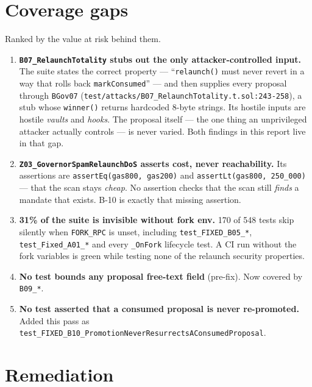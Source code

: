 \documentclass[11pt,a4paper]{article}
\newcommand{\code}[1]{\texttt{\small #1}}
\newcommand{\fileref}[1]{\texttt{\scriptsize #1}}
\begin{document}
\section{Coverage gaps}\label{sec:gaps}

Ranked by the value at risk behind them.

\begin{enumerate}
\item \textbf{\code{B07\_RelaunchTotality} stubs out the only attacker-controlled input.}
      The suite states the correct property --- ``\code{relaunch()} must never revert in a
      way that rolls back \code{markConsumed}'' --- and then supplies every proposal
      through \code{BGov07} (\fileref{test/attacks/B07\_RelaunchTotality.t.sol:243-258}), a
      stub whose \code{winner()} returns hardcoded 8-byte strings. Its hostile inputs are
      hostile \emph{vaults} and \emph{hooks}. The proposal itself --- the one thing an
      unprivileged attacker actually controls --- is never varied. Both findings in this
      report live in that gap.
\item \textbf{\code{Z03\_GovernorSpamRelaunchDoS} asserts cost, never reachability.}
      Its assertions are \code{assertEq(gas800, gas200)} and \code{assertLt(gas800,
      250\_000)} --- that the scan stays \emph{cheap}. No assertion checks that the scan
      still \emph{finds} a mandate that exists. B-10 is exactly that missing assertion.
\item \textbf{31\% of the suite is invisible without fork env.} 170 of 548 tests skip
      silently when \code{FORK\_RPC} is unset, including
      \code{test\_FIXED\_B05\_*}, \code{test\_Fixed\_A01\_*} and every
      \code{*\_OnFork} lifecycle test. A CI run without the fork variables is green while
      testing none of the relaunch security properties.
\item \textbf{No test bounds any proposal free-text field} (pre-fix). Now covered by
      \code{B09\_*}.
\item \textbf{No test asserted that a consumed proposal is never re-promoted.} Added this
      pass as \code{test\_FIXED\_B10\_PromotionNeverResurrectsAConsumedProposal}.
\end{enumerate}

\section{Remediation}\label{sec:remediation}
\end{document}
